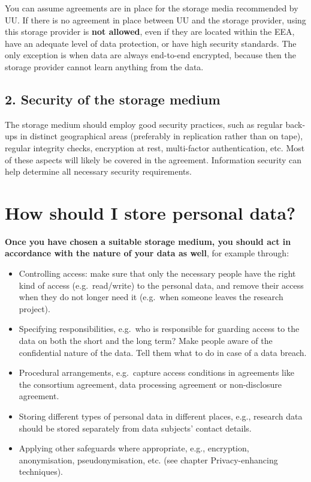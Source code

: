 \documentclass[
]{book}
\providecommand{\tightlist}{%
  \setlength{\itemsep}{0pt}\setlength{\parskip}{0pt}}
\begin{document}
You can assume agreements are in place for the storage media recommended by UU.
If there is no agreement in place between UU and the storage provider, using
this storage provider is \textbf{not allowed}, even if they are located within the EEA,
have an adequate level of data protection, or have high security standards. The
only exception is when data are always end-to-end encrypted, because then the
storage provider cannot learn anything from the data.

\hypertarget{security-of-the-storage-medium}{%
\subsection{2. Security of the storage medium}\label{security-of-the-storage-medium}}

The storage medium should employ good security practices, such as regular back-ups
in distinct geographical areas (preferably in replication rather than on tape),
regular integrity checks, encryption at rest, multi-factor authentication, etc.
Most of these aspects will likely be covered in the agreement. Information
security can help determine all necessary security requirements.

\hypertarget{data-storage-how}{%
\section{How should I store personal data?}\label{data-storage-how}}

\textbf{Once you have chosen a suitable storage medium, you should act in accordance
with the nature of your data as well}, for example through:

\begin{itemize}
\tightlist
\item
  Controlling access: make sure that only the necessary people have the right
  kind of access (e.g.~read/write) to the personal data, and remove their access
  when they do not longer need it (e.g.~when someone leaves the research project).\\
\item
  Specifying responsibilities, e.g.~who is responsible for guarding access to the
  data on both the short and the long term? Make people aware of the confidential
  nature of the data. Tell them what to do in case of a
  data breach.
\item
  Procedural arrangements, e.g.~capture access conditions in
  agreements like the consortium agreement,
  data processing agreement or non-disclosure agreement.
\item
  Storing different types of personal data in different places, e.g., research
  data should be stored separately from data subjects' contact details.
\item
  Applying other safeguards where appropriate, e.g., encryption, anonymisation,
  pseudonymisation, etc. (see chapter Privacy-enhancing
  techniques).
\end{itemize}
\end{document}
